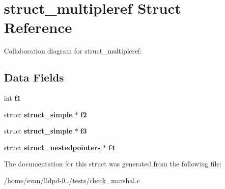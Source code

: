 \section{struct\-\_\-multipleref \-Struct \-Reference}
\label{structstruct__multipleref}


\-Collaboration diagram for struct\-\_\-multipleref\-:
\subsection*{\-Data \-Fields}
\begin{DoxyCompactItemize}
\item 
int {\bfseries f1}\label{structstruct__multipleref_aa75d52109f3f1fa6e40768b15db2814f}

\item 
struct {\bf struct\-\_\-simple} $\ast$ {\bfseries f2}\label{structstruct__multipleref_af134da997f760b659c965548ac9cc1ca}

\item 
struct {\bf struct\-\_\-simple} $\ast$ {\bfseries f3}\label{structstruct__multipleref_a206e279ef1265bb967262e5ed3707543}

\item 
struct {\bf struct\-\_\-nestedpointers} $\ast$ {\bfseries f4}\label{structstruct__multipleref_a75f7807bbea4a26f289b390f9b0218ce}

\end{DoxyCompactItemize}


\-The documentation for this struct was generated from the following file\-:\begin{DoxyCompactItemize}
\item 
/home/evan/lldpd-\/0../tests/check\-\_\-marshal.\-c\end{DoxyCompactItemize}
